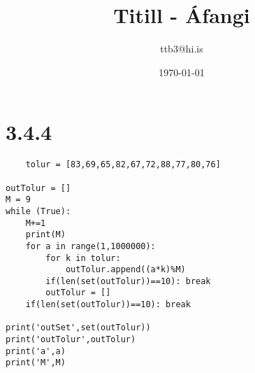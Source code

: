 \documentclass{article}
\title{Titill - Áfangi}
\author{ttb3@hi.is}
\date{\today}
\begin{document}
\maketitle


\section*{3.4.4}
\begin{lstlisting}
    tolur = [83,69,65,82,67,72,88,77,80,76]

outTolur = []
M = 9
while (True):
    M+=1
    print(M)
    for a in range(1,1000000):
        for k in tolur:
            outTolur.append((a*k)%M)
        if(len(set(outTolur))==10): break
        outTolur = []
    if(len(set(outTolur))==10): break

print('outSet',set(outTolur))
print('outTolur',outTolur)
print('a',a)
print('M',M)
\end{lstlisting}
\end{document}
